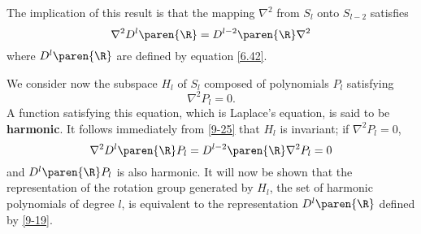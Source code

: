 The implication of this result is that the mapping $\nabla^{2}$ from $S_{l}$ onto $S_{l-2}$ satisfies
\begin{equation}
  \nabla^{2} D^{l}\paren{\R} = D^{l-2}\paren{\R}\nabla^{2}
\label{9-25}
\end{equation}
where $D^{l}\paren{\R}$ are defined by equation \eqref{6.42}.

We consider now the subspace $H_{l}$ of $S_{l}$ composed of polynomials $P_{l}$ satisfying
\begin{equation}
  \nabla^{2} P_{l} = 0.
\label{9-26}
\end{equation}
A function satisfying this equation, which is Laplace's equation, is said to be \textbf{harmonic}. It follows immediately from \eqref{9-25} that $H_{l}$ is invariant; if $\nabla^{2} P_{l} = 0$,
\begin{equation*}
  \nabla^{2} D^{l} \paren{\R}  P_{l} = D^{l-2} \paren{\R} \nabla^{2} P_{l} = 0
\end{equation*}
and $D^{l}\paren{\R}P_{l}$ is also harmonic. It will now be shown that the representation of the rotation group generated by $H_{l}$, the set of harmonic polynomials of degree $l$, is equivalent to the representation $D^{l}\paren{\R}$ defined by \eqref{9-19}.

